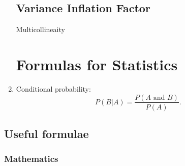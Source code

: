 \begin{enumerate}
\section{Variance Inflation Factor}

Multicollineaity

\chapter{Formulas for Statistics}


	
	\item Conditional probability:
	\begin{equation*}
	P(B|A)=\frac{P\left( A\text{ and }B\right) }{P\left( A\right) }.
	\end{equation*}
\end{enumerate}	

\section{Useful formulae}

\subsection{Mathematics}

